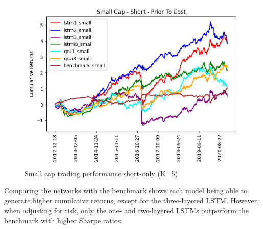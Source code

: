 \begin{figure}[H]
\centering
\includegraphics [scale=0.60,angle=360]{figures/cumulative_small_cap_return_no_cost_s.png}
\caption{Small cap trading performance short-only (K=5)}
\label{fig:shortsmall}
\end{figure} 
\indent\newline 
Comparing the networks with the benchmark shows each model being able to generate higher cumulative returns, except for the three-layered LSTM. However, when adjusting for risk, only the one- and two-layered LSTMs outperform the benchmark with higher Sharpe ratios.

